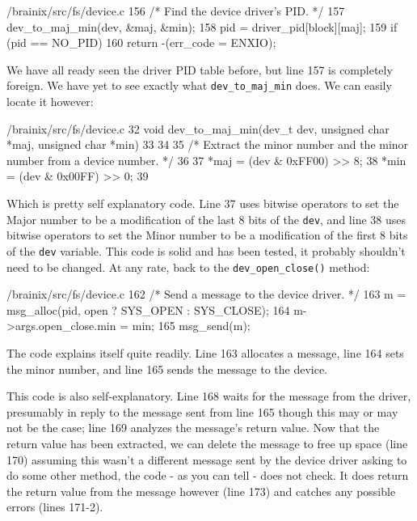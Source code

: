 \documentclass{article}
\begin{document}
\begin{code}{/brainix/src/fs/device.c}
156      /* Find the device driver's PID. */
157      dev_to_maj_min(dev, &maj, &min);
158      pid = driver_pid[block][maj];
159      if (pid == NO_PID)
160           return -(err_code = ENXIO);
\end{code} 
We have all ready seen the driver PID table before, but line 157 is completely foreign. We have yet to see exactly what \verb|dev_to_maj_min| does. We can easily locate it however:
\begin{code}{/brainix/src/fs/device.c}
32 void dev_to_maj_min(dev_t dev, unsigned char *maj, unsigned char *min)
33 {
34 
35 /* Extract the minor number and the minor number from a device number. */
36 
37      *maj = (dev & 0xFF00) >> 8;
38      *min = (dev & 0x00FF) >> 0;
39 }
\end{code}
Which is pretty self explanatory code. Line 37 uses bitwise operators to set the Major number to be a modification of the last 8 bits of the \verb|dev|, and line 38 uses bitwise operators to set the Minor number to be a modification of the first 8 bits of the \verb|dev| variable. This code is solid and has been tested, it probably shouldn't need to be changed. At any rate, back to the \verb|dev_open_close()| method:
\begin{code}{/brainix/src/fs/device.c}
162      /* Send a message to the device driver. */
163      m = msg_alloc(pid, open ? SYS_OPEN : SYS_CLOSE);
164      m->args.open_close.min = min;
165      msg_send(m);
\end{code}
The code explains itself quite readily. Line 163 allocates a message, line 164 sets the minor number, and line 165 sends the message to the device.
\begin{code}{/brainix/src/fs/device.c}
167      /* Await the device driver's reply. */
168      m = msg_receive(pid);
169      ret_val = m->args.open_close.ret_val;
170      msg_free(m);
171      if (ret_val < 0)
172           err_code = -ret_val;
173      return ret_val;
174 }
\end{code}
This code is also self-explanatory. Line 168 waits for the message from the driver, presumably in reply to the message sent from line 165 though this may or may not be the case; line 169 analyzes the message's return value. Now that the return value has been extracted, we can delete the message to free up space (line 170) assuming this wasn't a different message sent by the device driver asking to do some other method, the code - as you can tell - does not check. It does return the return value from the message however (line 173) and catches any possible errors (lines 171-2).
\end{document}
